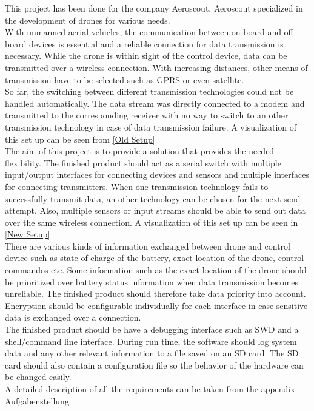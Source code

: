%
This project has been done for the company Aeroscout. Aeroscout specialized in the development of drones for various needs. \\
With unmanned aerial vehicles, the communication between on-board and off-board devices is essential and a reliable connection for data transmission is necessary. While the drone is within sight of the control device, data can be transmitted over a wireless connection. With increasing distances, other means of transmission have to be selected such as GPRS or even satellite.\\
So far, the switching between different transmission technologies could not be handled automatically. The data stream was directly connected to a modem and transmitted to the corresponding receiver with no way to switch to an other transmission technology in case of data transmission failure. A visualization of this set up can be seen from \autoref{Old Setup}\\
%
The aim of this project is to provide a solution that provides the needed flexibility. The finished product should act as a serial switch with multiple input/output interfaces for connecting devices and sensors and multiple interfaces for connecting transmitters. When one transmission technology fails to successfully transmit data, an other technology can be chosen for the next send attempt. Also, multiple sensors or input streams should be able to send out data over the same wireless connection. A visualization of this set up can be seen in \autoref{New Setup}\\
%
There are various kinds of information exchanged between drone and control device such as state of charge of the battery, exact location of the drone, control commandos etc. Some information such as the exact location of the drone should be prioritized over battery status information when data transmission becomes unreliable. The finished product should therefore take data priority into account. \\
Encryption should be configurable individually for each interface in case sensitive data is exchanged over a connection. \\
The finished product should be have a debugging interface such as SWD and a shell/command line interface. During run time, the software should log system data and any other relevant information to a file saved on an SD card. The SD card should also contain a configuration file so the behavior of the hardware can be changed easily. \\
A detailed description of all the requirements can be taken from the appendix Aufgabenstellung .
